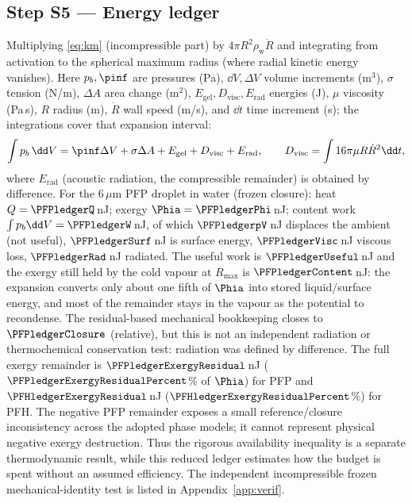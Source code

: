 \subsection{Step S5 --- Energy ledger}
Multiplying \eqref{eq:km} (incompressible part) by $4\pi R^2\rho_{\mathrm w}\dot R$ and integrating from
activation to the spherical maximum radius (where radial kinetic energy vanishes).
Here $p_b,\pinf$ are pressures (Pa), $\dd V,\Delta V$ volume increments (m$^3$),
$\sigma$ tension (N/m), $\Delta A$ area change (m$^2$), $E_{\mathrm{gel}},D_{\mathrm{visc}},
E_{\mathrm{rad}}$ energies (J), $\mu$ viscosity (Pa\,s), $R$ radius (m), $\dot R$ wall speed (m/s),
and $\dd t$ time increment (s); the integrations cover that expansion interval:
\begin{equation}
\int p_b\,\dd V=\pinf\Delta V+\sigma\Delta A+E_{\mathrm{gel}}+D_{\mathrm{visc}}+E_{\mathrm{rad}},\qquad
D_{\mathrm{visc}}=\int16\pi\mu R\dot R^2\dd t ,\label{eq:ledger}
\end{equation}
where $E_{\mathrm{rad}}$ (acoustic radiation, the compressible remainder) is obtained by difference.
For the 6\,$\mu$m PFP droplet in water (frozen closure): heat $Q=\PFPledgerQ$\,nJ; exergy
$\Phia=\PFPledgerPhi$\,nJ; content work $\int p_b\dd V=\PFPledgerW$\,nJ, of which $\PFPledgerpV$\,nJ
displaces the ambient (not useful), $\PFPledgerSurf$\,nJ is surface energy, $\PFPledgerVisc$\,nJ
viscous loss, $\PFPledgerRad$\,nJ radiated. The useful work is $\PFPledgerUseful$\,nJ and the
exergy still held by the cold vapour at $R_{\max}$ is $\PFPledgerContent$\,nJ: the expansion converts
only about one fifth of $\Phia$ into stored liquid/surface energy, and most of the remainder stays
in the vapour as the potential to recondense. The residual-based mechanical bookkeeping closes to
$\PFPledgerClosure$ (relative), but this is not an independent radiation or thermochemical conservation
test: radiation was defined by difference. The full exergy remainder is
$\PFPledgerExergyResidual$\,nJ ($\PFPledgerExergyResidualPercent$\% of $\Phia$) for PFP and
$\PFHledgerExergyResidual$\,nJ ($\PFHledgerExergyResidualPercent$\%) for PFH. The negative PFP
remainder exposes a small reference/closure inconsistency across the adopted phase models; it cannot
represent physical negative exergy destruction. Thus the rigorous availability inequality is a separate
thermodynamic result, while this reduced ledger estimates how the budget is spent without an assumed
efficiency. The independent incompressible frozen mechanical-identity test is listed in
Appendix~\ref{app:verif}.

